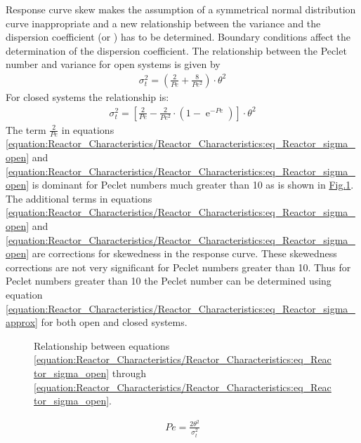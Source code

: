 \documentclass[letterpaper,10pt,english]{sphinxmanual}
\let\sphinxpxdimen\pdfpxdimen\else\newdimen\sphinxpxdimen
\begin{document}
Response curve skew makes the assumption of a symmetrical normal distribution curve inappropriate and a new relationship between the variance and the dispersion coefficient (or ) has to be determined. Boundary conditions affect the determination of the dispersion coefficient. The relationship between the Peclet number and variance for open systems is given by
\begin{equation}\label{equation:Reactor_Characteristics/Reactor_Characteristics:eq_Reactor_sigma_open}
\begin{split} \sigma _{t}^{2} =\left(\frac{2}{Pe} +\frac{8}{Pe^{2} } \right)\cdot \theta ^{2}\end{split}
\end{equation}
For closed systems the relationship is:
\begin{equation}\label{equation:Reactor_Characteristics/Reactor_Characteristics:eq_Reactor_sigma_closed}
\begin{split} \sigma _{t}^{2} =\left[\frac{2}{Pe} -\frac{2}{Pe^{2} } \cdot \left(1-{\mathop{e}\nolimits^{-Pe}} \right)\right]\cdot \theta ^{2}\end{split}
\end{equation}
The term \(\frac{2}{Pe}\) in equations \eqref{equation:Reactor_Characteristics/Reactor_Characteristics:eq_Reactor_sigma_open} and \eqref{equation:Reactor_Characteristics/Reactor_Characteristics:eq_Reactor_sigma_open} is dominant for Peclet numbers much greater than 10 as is shown in \hyperref[\detokenize{Reactor_Characteristics/Reactor_Characteristics:figure-pe-open-and-closed}]{Fig.\@ \ref{\detokenize{Reactor_Characteristics/Reactor_Characteristics:figure-pe-open-and-closed}}}. The additional terms in equations \eqref{equation:Reactor_Characteristics/Reactor_Characteristics:eq_Reactor_sigma_open} and \eqref{equation:Reactor_Characteristics/Reactor_Characteristics:eq_Reactor_sigma_open} are corrections for skewedness in the response curve. These skewedness corrections are not very significant for Peclet numbers greater than 10. Thus for Peclet numbers greater than 10 the Peclet number can be determined using equation \eqref{equation:Reactor_Characteristics/Reactor_Characteristics:eq_Reactor_sigma_approx} for both open and closed systems.

\begin{figure}[htbp]
\centering
\capstart

\noindent\sphinxincludegraphics[width=300\sphinxpxdimen]{{Pe_open_and_closed}.png}
\caption{Relationship between equations \eqref{equation:Reactor_Characteristics/Reactor_Characteristics:eq_Reactor_sigma_open} through \eqref{equation:Reactor_Characteristics/Reactor_Characteristics:eq_Reactor_sigma_open}.}\label{\detokenize{Reactor_Characteristics/Reactor_Characteristics:id8}}\label{\detokenize{Reactor_Characteristics/Reactor_Characteristics:figure-pe-open-and-closed}}\end{figure}
\begin{equation}\label{equation:Reactor_Characteristics/Reactor_Characteristics:eq_Reactor_sigma_approx}
\begin{split} Pe=\frac{2\theta ^{2} }{\sigma _{t}^{2} }\end{split}
\end{equation}
\end{document}
